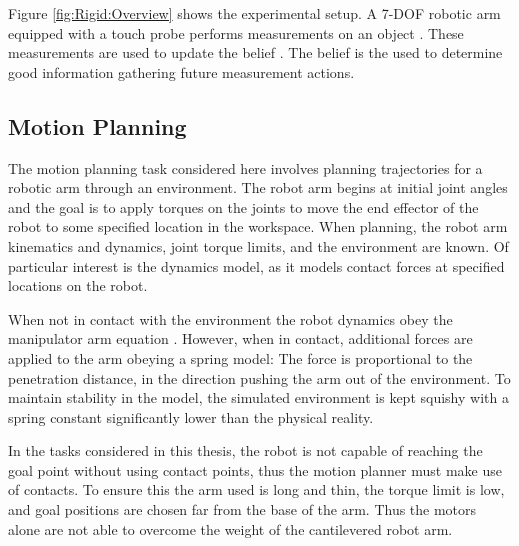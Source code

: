 \documentclass[../thesis.tex]{subfiles}
\begin{document}

Figure \ref{fig:Rigid:Overview} shows the experimental setup.
A 7-DOF robotic arm equipped with a touch probe performs measurements on an object .
These measurements are used to update the belief . The belief is the used to determine good information gathering future measurement actions.


\subsection{Motion Planning}
The motion planning task considered here involves planning trajectories for a robotic arm through an environment.
The robot arm begins at initial joint angles and the goal is to apply torques on the joints to move the end effector of the robot to some specified location in the workspace.
When planning, the robot arm kinematics and dynamics, joint torque limits, and the environment are known.
Of particular interest is the dynamics model, as it models contact forces at specified locations on the robot.

When not in contact with the environment the robot dynamics obey the manipulator arm equation \cite{murray1994mathematical}.
However, when in contact, additional forces are applied to the arm obeying a spring model: The force is proportional to the penetration distance, in the direction pushing the arm out of the environment.
To maintain stability in the model, the simulated environment is kept squishy with a spring constant significantly lower than the physical reality.

In the tasks considered in this thesis, the robot is not capable of reaching the goal point without using contact points, thus the motion planner must make use of contacts.
To ensure this the arm used is long and thin, the torque limit is low, and goal positions are chosen far from the base of the arm.
Thus the motors alone are not able to overcome the weight of the cantilevered robot arm.
\end{document}
